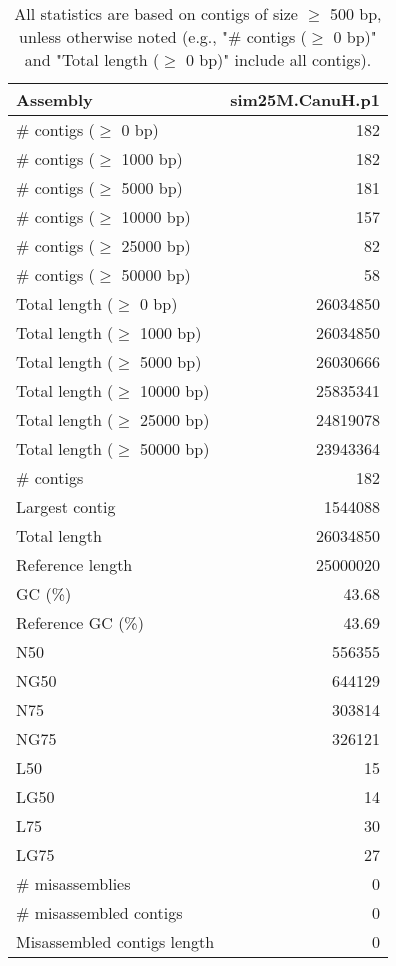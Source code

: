\documentclass[12pt,a4paper]{article}
\begin{document}
\begin{table}[ht]
\begin{center}
\caption{All statistics are based on contigs of size $\geq$ 500 bp, unless otherwise noted (e.g., "\# contigs ($\geq$ 0 bp)" and "Total length ($\geq$ 0 bp)" include all contigs).}
\begin{tabular}{|l*{1}{|r}|}
\hline
Assembly & sim25M.CanuH.p1 \\ \hline
\# contigs ($\geq$ 0 bp) & 182 \\ \hline
\# contigs ($\geq$ 1000 bp) & 182 \\ \hline
\# contigs ($\geq$ 5000 bp) & 181 \\ \hline
\# contigs ($\geq$ 10000 bp) & 157 \\ \hline
\# contigs ($\geq$ 25000 bp) & 82 \\ \hline
\# contigs ($\geq$ 50000 bp) & 58 \\ \hline
Total length ($\geq$ 0 bp) & 26034850 \\ \hline
Total length ($\geq$ 1000 bp) & 26034850 \\ \hline
Total length ($\geq$ 5000 bp) & 26030666 \\ \hline
Total length ($\geq$ 10000 bp) & 25835341 \\ \hline
Total length ($\geq$ 25000 bp) & 24819078 \\ \hline
Total length ($\geq$ 50000 bp) & 23943364 \\ \hline
\# contigs & 182 \\ \hline
Largest contig & 1544088 \\ \hline
Total length & 26034850 \\ \hline
Reference length & 25000020 \\ \hline
GC (\%) & 43.68 \\ \hline
Reference GC (\%) & 43.69 \\ \hline
N50 & 556355 \\ \hline
NG50 & 644129 \\ \hline
N75 & 303814 \\ \hline
NG75 & 326121 \\ \hline
L50 & 15 \\ \hline
LG50 & 14 \\ \hline
L75 & 30 \\ \hline
LG75 & 27 \\ \hline
\# misassemblies & 0 \\ \hline
\# misassembled contigs & 0 \\ \hline
Misassembled contigs length & 0 \\ \hline

\end{tabular}
\end{center}
\end{table}
\end{document}
